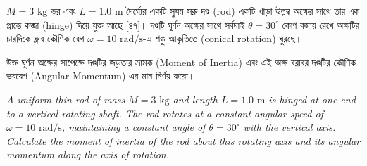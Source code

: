 \documentclass[12pt, a4paper]{article}
\begin{document}
\begin{tcolorbox}[questionbox={প্রশ্ন (Question) 7}]
\noindent
$M = 3\text{ kg}$ ভর এবং $L = 1.0\text{ m}$ দৈর্ঘ্যের একটি সুষম সরু দণ্ড (rod) একটি খাড়া উল্লম্ব অক্ষের সাথে তার এক প্রান্তে কব্জা (hinge) দিয়ে যুক্ত আছে [৪৭]। দণ্ডটি ঘূর্ণন অক্ষের সাথে সর্বদাই $\theta = 30^\circ$ কোণ বজায় রেখে অক্ষটির চারদিকে ধ্রুব কৌণিক বেগ $\omega = 10\text{ rad/s}$-এ শঙ্কু আকৃতিতে (conical rotation) ঘুরছে। 

\vspace{0.3em}
\noindent
উক্ত ঘূর্ণন অক্ষের সাপেক্ষে দণ্ডটির জড়তার ভ্রামক (Moment of Inertia) এবং এই অক্ষ বরাবর দণ্ডটির কৌণিক ভরবেগ (Angular Momentum)-এর মান নির্ণয় করো।

\vspace{0.8em}
\begin{english}
\noindent\textit{\color{darkgray}
A uniform thin rod of mass $M = 3\text{ kg}$ and length $L = 1.0\text{ m}$ is hinged at one end to a vertical rotating shaft. The rod rotates at a constant angular speed of $\omega = 10\text{ rad/s}$, maintaining a constant angle of $\theta = 30^\circ$ with the vertical axis. Calculate the moment of inertia of the rod about this rotating axis and its angular momentum along the axis of rotation.
}
\end{english}
\end{tcolorbox}
\end{document}
